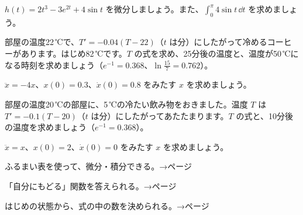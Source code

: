 \bkproblem $h(t)=2t^3-3e^{2t}+4\sin t$ を微分しましょう。また、$\displaystyle\int_0^{\pi}4\sin t\,\dd t$ を求めましょう。


\bkproblem 部屋の温度22\,℃で、$T'=-0.04(T-22)$（$t$ は分）にしたがって冷めるコーヒーがあります。はじめ82\,℃です。$T$ の式を求め、25分後の温度と、温度が50\,℃になる時刻を求めましょう（$e^{-1}=0.368$、$\ln\frac{15}{7}=0.762$）。

\bkproblem $\ddot{x}=-4x$、$x(0)=0.3$、$\dot{x}(0)=0.8$ をみたす $x$ を求めましょう。

\bkproblem 部屋の温度20\,℃の部屋に、5\,℃の冷たい飲み物をおきました。温度 $T$ は $T'=-0.1(T-20)$（$t$ は分）にしたがってあたたまります。$T$ の式と、10分後の温度を求めましょう（$e^{-1}=0.368$）。

\bkproblem $\ddot{x}=x$、$x(0)=2$、$\dot{x}(0)=0$ をみたす $x$ を求めましょう。

\begin{furikaeri}
\begin{checklist}
\item ふるまい表を使って、微分・積分できる。\hfill{\footnotesize\sffamily\color{bkTheme}→\pageref{bk:5-18:hyo}ページ}
\item 「自分にもどる」関数を答えられる。\hfill{\footnotesize\sffamily\color{bkTheme}→\pageref{bk:5-18:modoru}ページ}
\item はじめの状態から、式の中の数を決められる。\hfill{\footnotesize\sffamily\color{bkTheme}→\pageref{bk:5-18:shoki}ページ}
\end{checklist}
\end{furikaeri}

